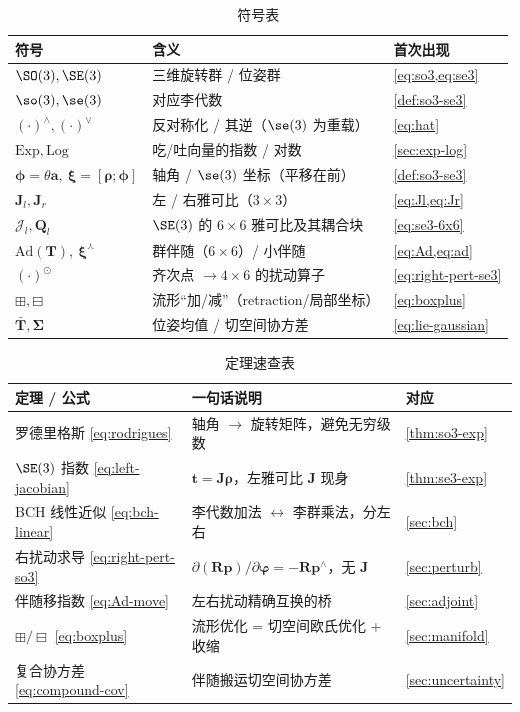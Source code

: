 \begin{table}[H]\centering\small
\caption{符号表}
\begin{tabular}{lll}
\toprule
符号 & 含义 & 首次出现 \\
\midrule
$\SO(3),\SE(3)$ & 三维旋转群 / 位姿群 & \cref{eq:so3,eq:se3} \\
$\so(3),\se(3)$ & 对应李代数 & \cref{def:so3-se3} \\
$(\cdot)^\wedge,(\cdot)^\vee$ & 反对称化 / 其逆（$\se(3)$ 为重载） & \cref{eq:hat} \\
$\mathrm{Exp},\mathrm{Log}$ & 吃/吐向量的指数 / 对数 & \cref{sec:exp-log} \\
$\boldsymbol{\phi}=\theta\mathbf{a},\ \boldsymbol{\xi}=[\boldsymbol{\rho};\boldsymbol{\phi}]$ & 轴角 / $\se(3)$ 坐标（平移在前） & \cref{def:so3-se3} \\
$\mathbf{J}_l,\mathbf{J}_r$ & 左 / 右雅可比（$3\times3$） & \cref{eq:Jl,eq:Jr} \\
$\boldsymbol{\mathcal{J}}_l,\mathbf{Q}_l$ & $\SE(3)$ 的 $6\times6$ 雅可比及其耦合块 & \cref{eq:se3-6x6} \\
$\mathrm{Ad}(\mathbf{T}),\ \boldsymbol{\xi}^\curlywedge$ & 群伴随（$6\times6$）/ 小伴随 & \cref{eq:Ad,eq:ad} \\
$(\cdot)^\odot$ & 齐次点 $\to 4\times6$ 的扰动算子 & \cref{eq:right-pert-se3} \\
$\boxplus,\boxminus$ & 流形“加/减”（retraction/局部坐标） & \cref{eq:boxplus} \\
$\bar{\mathbf{T}},\boldsymbol{\Sigma}$ & 位姿均值 / 切空间协方差 & \cref{eq:lie-gaussian} \\
\bottomrule
\end{tabular}
\end{table}

\begin{table}[H]\centering\small
\caption{定理速查表}
\begin{tabular}{lll}
\toprule
定理 / 公式 & 一句话说明 & 对应 \\
\midrule
罗德里格斯 \cref{eq:rodrigues} & 轴角 $\to$ 旋转矩阵，避免无穷级数 & \cref{thm:so3-exp} \\
$\SE(3)$ 指数 \cref{eq:left-jacobian} & $\mathbf{t}=\mathbf{J}\boldsymbol{\rho}$，左雅可比 $\mathbf{J}$ 现身 & \cref{thm:se3-exp} \\
BCH 线性近似 \cref{eq:bch-linear} & 李代数加法 $\leftrightarrow$ 李群乘法，分左右 & \cref{sec:bch} \\
右扰动求导 \cref{eq:right-pert-so3} & $\partial(\mathbf{R}\mathbf{p})/\partial\boldsymbol{\varphi}=-\mathbf{R}\mathbf{p}^\wedge$，无 $\mathbf{J}$ & \cref{sec:perturb} \\
伴随移指数 \cref{eq:Ad-move} & 左右扰动精确互换的桥 & \cref{sec:adjoint} \\
$\boxplus/\boxminus$ \cref{eq:boxplus} & 流形优化 = 切空间欧氏优化 + 收缩 & \cref{sec:manifold} \\
复合协方差 \cref{eq:compound-cov} & 伴随搬运切空间协方差 & \cref{sec:uncertainty} \\
\bottomrule
\end{tabular}
\end{table}


